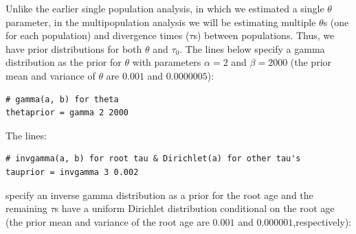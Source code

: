 \documentclass[a4paper]{book}
\numberwithin{equation}{section} \renewcommand{\baselinestretch}{0.55}
\begin{document}
Unlike the earlier single population analysis, in which we estimated a
single $\theta$ parameter, in the multipopulation analysis we will be
estimating multiple $\theta$s (one for each population) and divergence
times ($\tau$s) between populations. Thus, we have prior distributions
for both $\theta$ and $\tau_0$. The lines below specify a gamma distribution
as the prior for $\theta$ with parameters $\alpha = 2$ and $\beta = 2000$
(the prior mean and variance of $\theta$ are $0.001$ and $0.0000005$):
\begin{verbatim}
# gamma(a, b) for theta
thetaprior = gamma 2 2000 
\end{verbatim}
The lines:
\begin{verbatim}
# invgamma(a, b) for root tau & Dirichlet(a) for other tau's
tauprior = invgamma 3 0.002 
\end{verbatim}
specify an inverse gamma distribution as a prior for
the root age and the remaining $\tau$s have a uniform Dirichlet
distribution conditional on the root age (the prior mean and variance of the
root age are $0.001$ and $0.000001$,respectively):

\newpage
\end{document}
